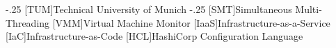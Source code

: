 \documentclass[headsepline,footsepline,footinclude=false,oneside,fontsize=11pt,paper=a4,listof=totoc,bibliography=totoc]{scrbook} %
\begin{document}


\frontmatter{}



%
%

\mainmatter{}

%




\appendix{}


\begin{acronym}
	\itemsep-.25\baselineskip
	[TUM]{Technical University of Munich}
	\itemsep-.25\baselineskip
	[SMT]{Simultaneous Multi-Threading}
	[VMM]{Virtual Machine Monitor}
	[IaaS]{Infrastructure-as-a-Service}
	[IaC]{Infrastructure-as-Code}
	[HCL]{HashiCorp Configuration Language}
\end{acronym}

\printbibliography{}
\end{document}
